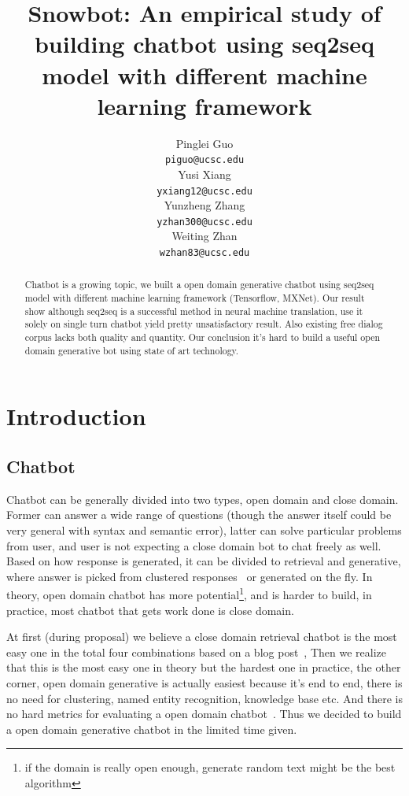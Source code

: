 \documentclass{article}
\title{Snowbot: An empirical study of building chatbot using seq2seq model with different machine learning framework}
\author{
Pinglei Guo \\
\texttt{piguo@ucsc.edu} \\
\And
Yusi Xiang \\
\texttt{yxiang12@ucsc.edu} \\
\And
Yunzheng Zhang \\
\texttt{yzhan300@ucsc.edu} \\
\And
Weiting Zhan \\
\texttt{wzhan83@ucsc.edu} \\
}
\begin{document}
\maketitle

\begin{abstract}
    Chatbot is a growing topic, we built a open domain generative chatbot using seq2seq model with different machine learning framework (Tensorflow, MXNet).
    Our result show although seq2seq is a successful method in neural machine translation, use it solely on single turn chatbot yield pretty unsatisfactory result.
    Also existing free dialog corpus lacks both quality and quantity.
    Our conclusion it's hard to build a useful open domain generative bot using state of art technology.
\end{abstract}

\section{Introduction}
\label{sec:introduction}

\subsection{Chatbot}
\label{subsec:chatbot}

Chatbot can be generally divided into two types, open domain and close domain.
Former can answer a wide range of questions (though the answer itself could be very general with syntax and semantic error),
latter can solve particular problems from user, and user is not expecting a close domain bot to chat freely as well.
Based on how response is generated, it can be divided to retrieval and generative,
where answer is picked from clustered responses~\cite{kannan2016smart} or generated on the fly.
In theory, open domain chatbot has more potential\footnote{if the domain is really open enough, generate random text might be the best algorithm},
and is harder to build, in practice, most chatbot that gets work done is close domain.

At first (during proposal) we believe a close domain retrieval chatbot is the most easy one in the total four combinations based on a blog post~\cite{wildml},
Then we realize that this is the most easy one in theory but the hardest one in practice, the other corner,
open domain generative is actually easiest because it's end to end, there is no need for clustering, named entity recognition, knowledge base etc.
And there is no hard metrics for evaluating a open domain chatbot~\cite{liu2016not}.
Thus we decided to build a open domain generative chatbot in the limited time given.
\end{document}

